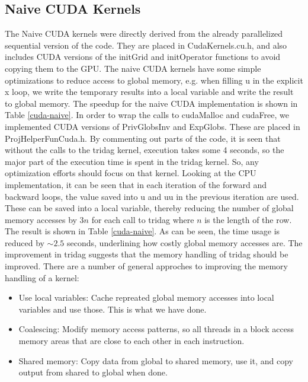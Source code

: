 \documentclass{article}
\begin{document}
\subsection*{Naive CUDA Kernels}
The Naive CUDA kernels were directly derived from the already parallelized sequential version of the code. They are placed in CudaKernels.cu.h, and also includes CUDA versions of the initGrid and initOperator functions to avoid copying them to the GPU. The naive CUDA kernels have some simple optimizations to reduce access to global memory, e.g. when filling u in the explicit x loop, we write the temporary results into a local variable and write the result to global memory. The speedup for the naive CUDA implementation is shown in Table \ref{cuda-naive}.
\newline\newline
In order to wrap the calls to cudaMalloc and cudaFree, we implemented CUDA versions of PrivGlobsInv and ExpGlobs. These are placed in ProjHelperFunCuda.h. 
\newline\newline
By commenting out parts of the code, it is seen that without the calls to the tridag kernel, execution takes some 4 seconds, so the major part of the execution time is spent in the tridag kernel. So, any optimization efforts should focus on that kernel. Looking at the CPU implementation, it can be seen that in each iteration of the forward and backward loops, the value saved into u and uu in the previous iteration are used. These can be saved into a local variable, thereby reducing the number of global memory accesses by $3n$ for each call to tridag where $n$ is the length of the row. The result is shown in Table \ref{cuda-naive}. As can be seen, the time usage is reduced by $\sim 2.5$ seconds, underlining how costly global memory accesses are.
\newline\newline
The improvement in tridag suggests that the memory handling of tridag should be improved. There are a number of general approches to improving the memory handling of a kernel:
\begin{itemize}
    \item {Use local variables: Cache repreated global memory accesses into local variables and use those. This is what we have done.}
    \item {Coalescing: Modify memory access patterns, so all threads in a block access memory areas that are close to each other in each instruction.}
    \item {Shared memory: Copy data from global to shared memory, use it, and copy output from shared to global when done.}
\end{itemize}
\end{document}
